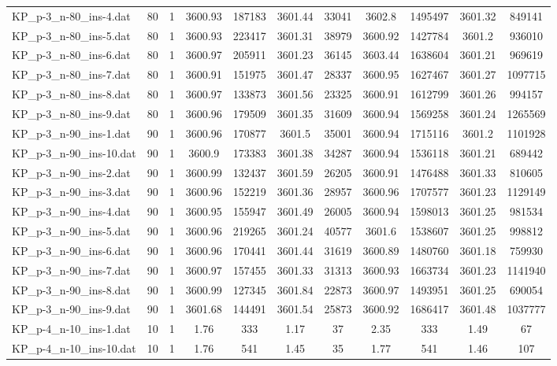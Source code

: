 \begin{table}[!ht]
\begin{tabular}{lcccccccccc}
KP\_p-3\_n-80\_ins-4.dat & 80 & 1 & 3600.93 & 187183 & 3601.44 & 33041 & 3602.8 & 1495497 & 3601.32 & 849141 \\
KP\_p-3\_n-80\_ins-5.dat & 80 & 1 & 3600.93 & 223417 & 3601.31 & 38979 & 3600.92 & 1427784 & 3601.2 & 936010 \\
KP\_p-3\_n-80\_ins-6.dat & 80 & 1 & 3600.97 & 205911 & 3601.23 & 36145 & 3603.44 & 1638604 & 3601.21 & 969619 \\
KP\_p-3\_n-80\_ins-7.dat & 80 & 1 & 3600.91 & 151975 & 3601.47 & 28337 & 3600.95 & 1627467 & 3601.27 & 1097715 \\
KP\_p-3\_n-80\_ins-8.dat & 80 & 1 & 3600.97 & 133873 & 3601.56 & 23325 & 3600.91 & 1612799 & 3601.26 & 994157 \\
KP\_p-3\_n-80\_ins-9.dat & 80 & 1 & 3600.96 & 179509 & 3601.35 & 31609 & 3600.94 & 1569258 & 3601.24 & 1265569 \\
KP\_p-3\_n-90\_ins-1.dat & 90 & 1 & 3600.96 & 170877 & 3601.5 & 35001 & 3600.94 & 1715116 & 3601.2 & 1101928 \\
KP\_p-3\_n-90\_ins-10.dat & 90 & 1 & 3600.9 & 173383 & 3601.38 & 34287 & 3600.94 & 1536118 & 3601.21 & 689442 \\
KP\_p-3\_n-90\_ins-2.dat & 90 & 1 & 3600.99 & 132437 & 3601.59 & 26205 & 3600.91 & 1476488 & 3601.33 & 810605 \\
KP\_p-3\_n-90\_ins-3.dat & 90 & 1 & 3600.96 & 152219 & 3601.36 & 28957 & 3600.96 & 1707577 & 3601.23 & 1129149 \\
KP\_p-3\_n-90\_ins-4.dat & 90 & 1 & 3600.95 & 155947 & 3601.49 & 26005 & 3600.94 & 1598013 & 3601.25 & 981534 \\
KP\_p-3\_n-90\_ins-5.dat & 90 & 1 & 3600.96 & 219265 & 3601.24 & 40577 & 3601.6 & 1538607 & 3601.25 & 998812 \\
KP\_p-3\_n-90\_ins-6.dat & 90 & 1 & 3600.96 & 170441 & 3601.44 & 31619 & 3600.89 & 1480760 & 3601.18 & 759930 \\
KP\_p-3\_n-90\_ins-7.dat & 90 & 1 & 3600.97 & 157455 & 3601.33 & 31313 & 3600.93 & 1663734 & 3601.23 & 1141940 \\
KP\_p-3\_n-90\_ins-8.dat & 90 & 1 & 3600.99 & 127345 & 3601.84 & 22873 & 3600.97 & 1493951 & 3601.25 & 690054 \\
KP\_p-3\_n-90\_ins-9.dat & 90 & 1 & 3601.68 & 144491 & 3601.54 & 25873 & 3600.92 & 1686417 & 3601.48 & 1037777 \\
KP\_p-4\_n-10\_ins-1.dat & 10 & 1 & 1.76 & 333 & 1.17 & 37 & 2.35 & 333 & 1.49 & 67 \\
KP\_p-4\_n-10\_ins-10.dat & 10 & 1 & 1.76 & 541 & 1.45 & 35 & 1.77 & 541 & 1.46 & 107 \\

\end{tabular}
\end{table}
